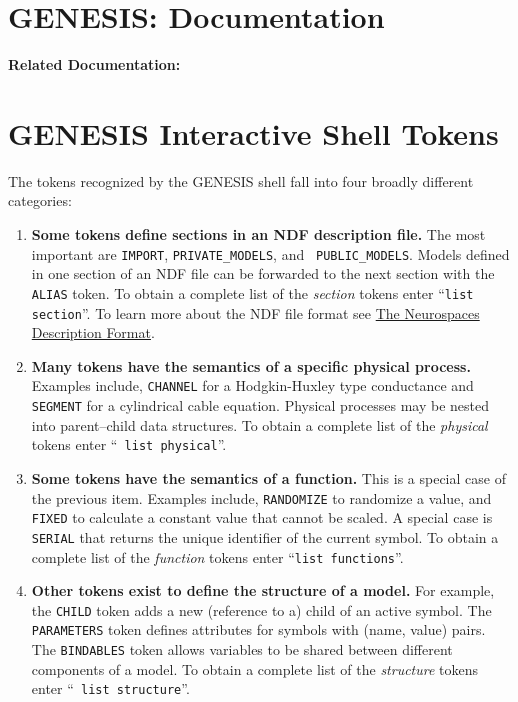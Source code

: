 \documentclass[12pt]{article}
\begin{document}
\section*{GENESIS: Documentation}

{\bf Related Documentation:}

\section*{GENESIS Interactive Shell Tokens}

The tokens recognized by the GENESIS shell fall into four broadly different categories:

\begin{enumerate}

\item {\bf Some tokens define sections in an NDF description file.}
  The most important are {\tt IMPORT}, {\tt PRIVATE\_MODELS}, and {\tt
    PUBLIC\_MODELS}. Models defined in one section of an NDF file can
  be forwarded to the next section with the {\tt ALIAS} token. To
  obtain a complete list of the {\it section} tokens enter ``{\tt list
    section}''. To learn more about the NDF file format see
  \href{../ndf-file-format/ndf-file-format.tex}{The Neurospaces
    Description Format}.

\item {\bf Many tokens have the semantics of a specific physical
    process.} Examples include, {\tt CHANNEL} for a Hodgkin-Huxley
  type conductance and {\tt SEGMENT} for a cylindrical cable equation.
  Physical processes may be nested into parent--child data structures.
  To obtain a complete list of the {\it physical} tokens enter ``{\tt
    list physical}''.

\item {\bf Some tokens have the semantics of a function.} This is a
  special case of the previous item. Examples include, {\tt RANDOMIZE}
  to randomize a value, and {\tt FIXED} to calculate a constant value
  that cannot be scaled. A special case is {\tt SERIAL} that returns
  the unique identifier of the current symbol.  To obtain a complete
  list of the {\it function} tokens enter ``{\tt list functions}''.

\item {\bf Other tokens exist to define the structure of a model.} For
  example, the {\tt CHILD} token adds a new (reference to a) child of
  an active symbol. The {\tt PARAMETERS} token defines attributes for
  symbols with (name, value) pairs. The {\tt BINDABLES} token allows
  variables to be shared between different components of a model. To
  obtain a complete list of the {\it structure} tokens enter ``{\tt
    list structure}''.

\end{enumerate}
\end{document}
